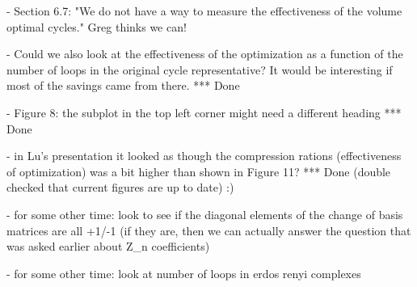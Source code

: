 \documentclass{article}
\begin{document}
- Section 6.7: "We do not have a way to measure the effectiveness of the volume optimal cycles."  Greg thinks we can!


- Could we also look at the effectiveness of the optimization as a function of the number of loops in the original cycle representative?  It would be interesting if most of the savings came from there.
    *** Done

- Figure 8: the subplot in the top left corner might need a different heading
    *** Done
    
- in Lu's presentation it looked as though the compression rations (effectiveness of optimization) was a bit higher than shown in Figure 11?
    *** Done (double checked that current figures are up to date) :)


- for some other time: look to see if the diagonal elements of the change of basis matrices are all +1/-1 (if they are, then we can actually answer the question that was asked earlier about Z_n coefficients)

- for some other time: look at number of loops in erdos renyi complexes
\end{document}
